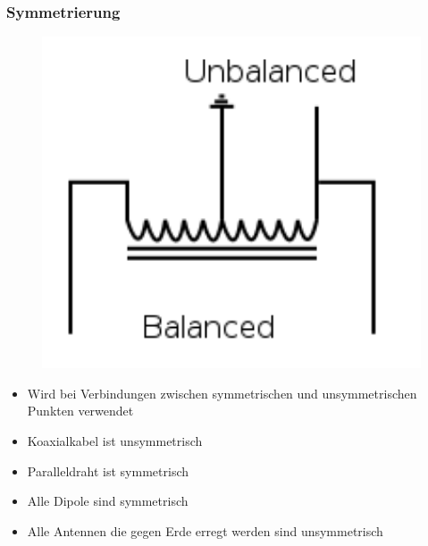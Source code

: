 \begin{frame}
  \frametitle{Symmetrierung}
  \begin{minipage}{0.3\textwidth}
    \begin{figure}
      \includegraphics[width=1\textwidth,height=.8\textheight,keepaspectratio]{e10/balun.png}
    \end{figure}

  \end{minipage}
  \begin{minipage}{0.6\textwidth}
    \begin{itemize}
      \item Wird bei Verbindungen zwischen symmetrischen und unsymmetrischen Punkten verwendet
      \item Koaxialkabel ist unsymmetrisch
      \item Paralleldraht ist symmetrisch
      \item Alle Dipole sind symmetrisch
      \item Alle Antennen die gegen Erde erregt werden sind unsymmetrisch
    \end{itemize}
  \end{minipage}
\end{frame}

